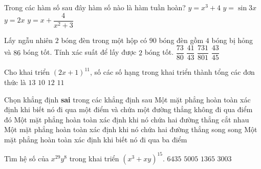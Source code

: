 \begin{ex}%
	Trong các hàm số sau đây hàm số nào là hàm tuần hoàn?
	\choice
	{$y=x^3+4$}
	{\True $y=\sin 3x$}
	{$y=2x$}
	{$y=x+\dfrac{4}{x^2+3}$}
\end{ex}

\begin{ex}%
	 Lấy ngẫu nhiên $2$ bóng đèn trong một hộp có $90$ bóng đèn gồm $4$ bóng bị hỏng và $86$ bóng tốt. Tính xác suất để lấy được $2$ bóng tốt. 
	\choice
	{$\dfrac{73}{80}$}
	{$\dfrac{41}{43}$}
	{\True $\dfrac{731}{801}$}
	{$\dfrac{43}{45}$}
\end{ex}

\begin{ex}%
	  Cho khai triển $(2x+1)^{11}$, số các số hạng trong khai triển thành tổng các đơn thức là  
	\choice
	{$13$}
	{$10$}
	{\True $12$}
	{$11$}
\end{ex}

\begin{ex}%
	 Chọn khẳng định {\bf sai} trong các khẳng định sau
	\choice
	{ Một mặt phẳng hoàn toàn xác định khi biết nó đi qua một điểm và chứa một đường thẳng không đi qua điểm đó}
	{Một mặt phẳng hoàn toàn xác định khi nó chứa hai đường thẳng cắt nhau}
	{Một mặt phẳng hoàn toàn xác định khi nó chứa hai đường thẳng song song}
	{\True Một mặt phẳng hoàn toàn xác định khi biết nó đi qua ba điểm}
\end{ex}

\begin{ex}%
	Tìm hệ số của $x^{29}y^8$ trong khai triển $\left(x^3 + xy\right)^{15}$.
	\choice
	{\True $6435$}
	{$5005$}
	{$1365$}
	{$3003$}
\end{ex}

